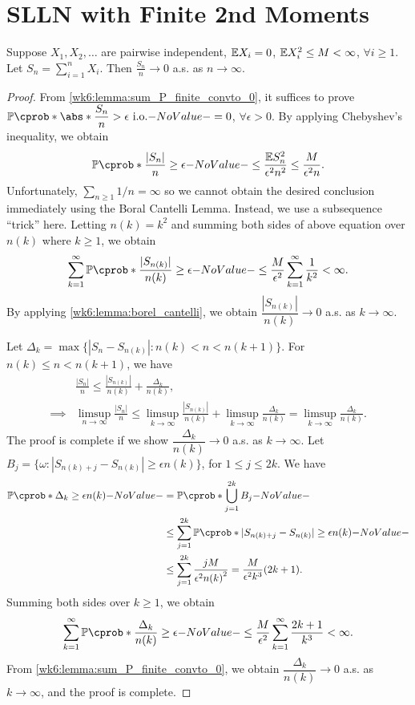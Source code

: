 \documentclass[12pt]{article}
\begin{document}
\section{SLLN with Finite 2nd Moments}
\begin{Lemma}\label{wk6:lemma:SLLN_2nd_moments}
Suppose $X_1, X_2, \ldots$ are pairwise independent, $\E X_i = 0$, $\E X_i^2 \leq M < \infty$, $\forall i \geq 1$. Let $S_n = \sum_{i=1}^n X_i$. Then $\frac{S_n}{n} \to 0$ a.s. as $n \to \infty$.
\end{Lemma}
\begin{proof}
From \cref{wk6:lemma:sum_P_finite_convto_0}, it suffices to prove $\P(\abs*{\dfrac{S_n}{n}} > \epsilon \io) = 0$, $\forall \epsilon > 0$.
By applying Chebyshev's inequality, we obtain
\begin{align*}
\P(\frac{|S_n|}{n} \geq \epsilon) \leq \frac{\E S_n^2}{\epsilon^2 n^2} \leq \frac{M}{\epsilon^2 n}.
\end{align*}
Unfortunately, $\sum_{n\geq1} 1/n = \infty$ so we cannot obtain the desired conclusion immediately using the Boral Cantelli Lemma. Instead, we use a subsequence ``trick'' here. Letting $n(k) = k^2$ and summing both sides of above equation over $n(k)$ where $k \geq 1$, we obtain
\begin{align*}
\sum_{k=1}^{\infty} \P(\frac{|S_{n(k)}|}{n(k)} \geq \epsilon) 
\leq \frac{M}{\epsilon^2} \sum_{k=1}^{\infty} \frac{1}{k^2} < \infty.
\end{align*}
By applying \cref{wk6:lemma:borel_cantelli}, we obtain $\dfrac{|S_{n(k)}|}{n(k)} \to 0$ a.s. as $k \to \infty$.

Let $\Delta_k = \max \big\{|S_n - S_{n(k)}|: n(k) < n < n(k+1)\big\}$. For $n(k) \leq n < n(k+1)$, we have
\begin{align*}
&\frac{|S_n|}{n} \leq \frac{|S_{n(k)}|}{n(k)} + \frac{\Delta_k}{n(k)}, \\
\implies
&\limsup_{n \to \infty}\frac{|S_n|}{n} \leq \limsup_{k \to \infty}\frac{|S_{n(k)}|}{n(k)} + \limsup_{k \to \infty}\frac{\Delta_k}{n(k)} = \limsup_{k \to \infty}\frac{\Delta_k}{n(k)}.
\end{align*}
The proof is complete if we show $\dfrac{\Delta_k}{n(k)} \to 0$ a.s. as $k \to \infty$. Let $B_j = \big\{\omega: |S_{n(k)+j} - S_{n(k)}| \geq \epsilon n(k)\big\}$, for $1 \leq j \leq 2k$. We have
\begin{align*}
\P(\Delta_k \geq \epsilon n(k)) 
&= \P(\bigcup_{j=1}^{2k} B_j)\\
&\leq \sum_{j=1}^{2k} \P(|S_{n(k)+j} - S_{n(k)}| \geq \epsilon n(k)) \\
&\leq \sum_{j=1}^{2k} \frac{jM}{\epsilon^2 {n(k)}^2}
= \frac{M}{\epsilon^2 k^3} (2k +1).
\end{align*}
Summing both sides over $k \geq 1$, we obtain
\begin{align*}
\sum_{k=1}^{\infty} \P(\frac{\Delta_k}{n(k)} \geq \epsilon)
\leq \frac{M}{\epsilon^2} \sum_{k=1}^{\infty} \frac{2k +1}{k^3} < \infty.
\end{align*}
From \cref{wk6:lemma:sum_P_finite_convto_0}, we obtain $\dfrac{\Delta_k}{n(k)} \to 0$ a.s. as $k \to \infty$, and the proof is complete.
\end{proof}
\end{document}
